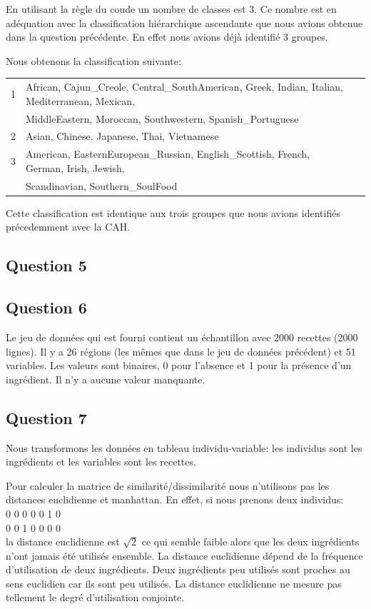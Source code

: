 \documentclass[a4paper,11pt,oneside,roman]{article}
\begin{document}
    En utilisant la règle du coude un nombre de classes est 3.
    Ce nombre est en adéquation avec la classification hiérarchique ascendante que nous avions obtenue dans la question précédente.
    En effet nous avions déjà identifié 3 groupes.

    Nous obtenons la classification suivante:
    \begin{center}
        \begin{tabular}{|l|l|l|}
            \hline
            1 & African, Cajun\_Creole, Central\_SouthAmerican, Greek, Indian, Italian, Mediterranean, Mexican, \\
            & MiddleEastern, Moroccan, Southwestern, Spanish\_Portuguese\\
            \hline
            2 & Asian, Chinese, Japanese, Thai, Vietnamese\\
            \hline
            3 & American, EasternEuropean\_Russian, English\_Scottish, French, German, Irish, Jewish,\\
            & Scandinavian, Southern\_SoulFood\\
            \hline
        \end{tabular}
    \end{center}
    Cette classification est identique aux trois groupes que nous avions identifiés précedemment avec la CAH.

    \subsection*{Question 5}

    \subsection*{Question 6}
    Le jeu de données qui est fourni contient un échantillon avec 2000 recettes (2000 lignes).
    Il y a 26 régions (les mêmes que dans le jeu de données précédent) et 51 variables.
    Les valeurs sont binaires, 0 pour l'absence et 1 pour la présence d'un ingrédient.
    Il n'y a aucune valeur manquante.
    
    \subsection*{Question 7}

    Nous transformons les données en tableau individu-variable: les individus sont les ingrédients et les variables sont les recettes.
   
    Pour calculer la matrice de similarité/dissimilarité nous n'utilisons pas les distances euclidienne et manhattan.
    En effet, si nous prenons deux individus:\\
    0 0 0 0 0 1 0\\
    0 0 1 0 0 0 0\\
    la distance euclidienne est $\sqrt{2}$ ce qui semble faible alors que les deux ingrédients n'ont jamais été utilisés ensemble. 
    La distance euclidienne dépend de la fréquence d'utilisation de deux ingrédients. 
    Deux ingrédients peu utilisés sont proches au sens euclidien car ils sont peu utilisés.
    La distance euclidienne ne mesure pas tellement le degré d'utilisation conjointe.
\end{document}
